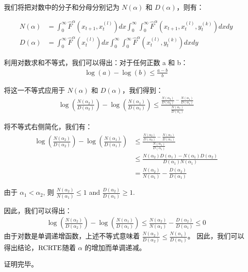 我们将把对数中的分子和分母分别记为 $N(\alpha)$ 和 $D(\alpha)$，则有：

\begin{align*}
N(\alpha) &= \int_{0}^{\infty}\hat F^{\alpha}(x_{t+1},x_{t}^{(l)})dx \int_{0}^{\infty}\int_{0}^{\infty}\hat F^{\alpha}(x_{t+1},x_{t}^{(l)},y_{t}^{(k)})dxdy\\
D(\alpha) &= \int_{0}^{\infty}\hat F^{\alpha}(x_{t}^{(l)})dx \int_{0}^{\infty}\int_{0}^{\infty}\hat F^{\alpha}(x_{t}^{(l)},y_{t}^{(k)})dxdy
\end{align*}

利用对数求和不等式，我们可以得出：对于任何正数 a 和 b：
\begin{align*}
\log(a) - \log(b) \leq \frac{a-b}{b}
\end{align*}

将这一不等式应用于 $N(\alpha)$ 和 $D(\alpha)$，我们得到：
\begin{align*}
\log\left(\frac{N(\alpha_2)}{D(\alpha_2)}\right) - \log\left(\frac{N(\alpha_1)}{D(\alpha_1)}\right) \leq \frac{\frac{N(\alpha_2)}{D(\alpha_2)} - \frac{N(\alpha_1)}{D(\alpha_1)}}{\frac{N(\alpha_1)}{D(\alpha_1)}}
\end{align*}

将不等式右侧简化，我们有：
\begin{align*}
\log\left(\frac{N(\alpha_2)}{D(\alpha_2)}\right) - \log\left(\frac{N(\alpha_1)}{D(\alpha_1)}\right) &\leq \frac{\frac{N(\alpha_2)}{D(\alpha_2)} - \frac{N(\alpha_1)}{D(\alpha_1)}}{\frac{N(\alpha_1)}{D(\alpha_1)}}\\
& \leq \frac{N(\alpha_2)D(\alpha_1) - N(\alpha_1)D(\alpha_2)}{D(\alpha_1)N(\alpha_1)}\\
&= \frac{N(\alpha_2)}{N(\alpha_1)} - \frac{D(\alpha_2)}{D(\alpha_1)}
\end{align*}

由于 $\alpha_1 < \alpha_2$, 则 $\frac{N(\alpha_2)}{N(\alpha_1)} \leq 1$ and $\frac{D(\alpha_2)}{D(\alpha_1)} \geq 1$.

因此，我们可以得出：
\begin{align*}
\log\left(\frac{N(\alpha_2)}{D(\alpha_2)}\right) - \log\left(\frac{N(\alpha_1)}{D(\alpha_1)}\right) \leq \frac{N(\alpha_2)}{N(\alpha_1)} - \frac{D(\alpha_2)}{D(\alpha_1)} \leq 0
\end{align*}
由于对数是单调递增函数，上述不等式意味着 $\frac{N(\alpha_2)}{D(\alpha_2)} \leq \frac{N(\alpha_1)}{D(\alpha_1)}$。
因此，我们可以得出结论，$\rm{RCRTE}$随着 $\alpha$ 的增加而单调递减。

证明完毕。\\

